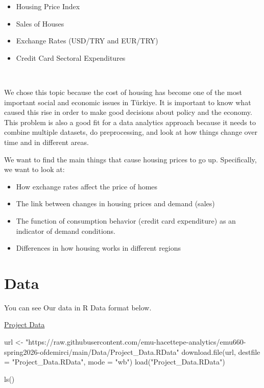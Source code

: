 \documentclass[
  11pt,
  a4paper,
  DIV=11,
  numbers=noendperiod]{scrartcl}
\newenvironment{Shaded}{\begin{snugshade}}{\end{snugshade}}
\newcommand{\AttributeTok}[1]{\textcolor[rgb]{0.40,0.45,0.13}{#1}}
\newcommand{\FunctionTok}[1]{\textcolor[rgb]{0.28,0.35,0.67}{#1}}
\newcommand{\NormalTok}[1]{\textcolor[rgb]{0.00,0.23,0.31}{#1}}
\newcommand{\OtherTok}[1]{\textcolor[rgb]{0.00,0.23,0.31}{#1}}
\newcommand{\StringTok}[1]{\textcolor[rgb]{0.13,0.47,0.30}{#1}}
\begin{document}
\begin{itemize}
\item
  Housing Price Index
\item
  Sales of Houses
\item
  Exchange Rates (USD/TRY and EUR/TRY)
\item
  Credit Card Sectoral Expenditures\\
  \strut \\
\end{itemize}

We chose this topic because the cost of housing has become one of the
most important social and economic issues in Türkiye. It is important to
know what caused this rise in order to make good decisions about policy
and the economy. This problem is also a good fit for a data analytics
approach because it needs to combine multiple datasets, do
preprocessing, and look at how things change over time and in different
areas.

We want to find the main things that cause housing prices to go up.
Specifically, we want to look at:

\begin{itemize}
\item
  How exchange rates affect the price of homes
\item
  The link between changes in housing prices and demand (sales)
\item
  The function of consumption behavior (credit card expenditure) as an
  indicator of demand conditions.
\item
  Differences in how housing works in different regions
\end{itemize}

\section{Data}\label{data}

You can see Our data in R Data format below.

\href{https://github.com/emu-hacettepe-analytics/emu660-spring2026-ofdemirci/blob/e273d93492dc0a2ea56f85a472a398fe4909c2d7/Data/Project_Data.RData}{Project
Data}

\begin{Shaded}
\begin{Highlighting}[]
\NormalTok{url }\OtherTok{\textless{}{-}} \StringTok{"https://raw.githubusercontent.com/emu{-}hacettepe{-}analytics/emu660{-}spring2026{-}ofdemirci/main/Data/Project\_Data.RData"}
\FunctionTok{download.file}\NormalTok{(url, }\AttributeTok{destfile =} \StringTok{"Project\_Data.RData"}\NormalTok{, }\AttributeTok{mode =} \StringTok{"wb"}\NormalTok{)}
\FunctionTok{load}\NormalTok{(}\StringTok{"Project\_Data.RData"}\NormalTok{)}

\FunctionTok{ls}\NormalTok{()}
\end{Highlighting}
\end{Shaded}
\end{document}
